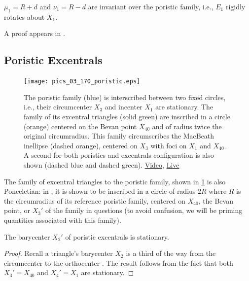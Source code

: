 \begin{proposition}
$\mu_1=R+d$ and $\nu_1=R-d$ are invariant over the poristic family, i.e., $E_1$ rigidly rotates about $X_1$. \label{prop:03-e1}
\end{proposition}

A proof appears in \cite[Appendix C]{garcia2020-similarity-I}.

\subsection{Poristic Excentrals}

\begin{figure}
    \centering
    \texttt{[image: pics\_03\_170\_poristic.eps]}
    \caption{The poristic family (blue) is interscribed between two fixed circles, i.e., their circumcenter $X_3$ and incenter $X_1$ are stationary. The family of its excentral triangles (solid green) are inscribed in a circle (orange) centered on the Bevan point $X_{40}$ and of radius twice the original circumradius. This family circumscribes the MacBeath inellipse (dashed orange), centered on $X_3$ with foci on $X_1$ and $X_{40}$. A second for both poristics and excentrals configuration is also shown (dashed blue and dashed green).  \href{https://youtu.be/DS4ryndDK6Q}{Video}, \href{https://bit.ly/2RoYJHm}{Live}}
    \label{fig:03-poristic-excentrals}
\end{figure}

The family of excentral triangles to the poristic family, shown in \cref{fig:03-poristic-excentrals} is also Ponceletian: in \cite{odehnal2011-poristic}, it is shown to be inscribed in a circle of radius $2R$ where $R$ is the circumradius of its reference poristic family, centered on $X_{40}$, the Bevan point, or $X_3'$ of the family in questions (to avoid confusion, we will be priming quantities associated with this family).

\begin{proposition}
The barycenter $X_2'$ of poristic excentrals is stationary.
\end{proposition}

\begin{proof}
Recall a triangle's barycenter $X_2$ is a third of the way from the circumcenter to the orthocenter \cite[Euler Line, Eqn. 6]{mw}. The result follows from the fact that both $X_3'=X_{40}$ and $X_4'=X_1$ are stationary.
\end{proof}

